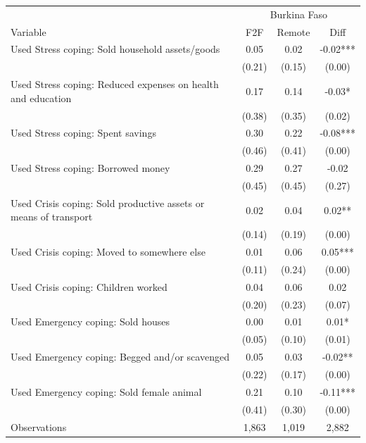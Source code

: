 \begin{tabular}{l*{3}c}
\hline\hline
 & \multicolumn{3}{c}{Burkina Faso}\\ 
Variable & F2F & Remote & Diff \\
\hline
Used Stress coping: Sold household assets/goods&0.05&0.02&-0.02***\\
&(0.21)&(0.15)&(0.00)\\
Used Stress coping: Reduced expenses on health and education&0.17&0.14&-0.03*\\
&(0.38)&(0.35)&(0.02)\\
Used Stress coping: Spent savings&0.30&0.22&-0.08***\\
&(0.46)&(0.41)&(0.00)\\
Used Stress coping: Borrowed money&0.29&0.27&-0.02\\
&(0.45)&(0.45)&(0.27)\\
Used Crisis coping: Sold productive assets or means of transport&0.02&0.04&0.02**\\
&(0.14)&(0.19)&(0.00)\\
Used Crisis coping: Moved to somewhere else&0.01&0.06&0.05***\\
&(0.11)&(0.24)&(0.00)\\
Used Crisis coping: Children worked&0.04&0.06&0.02\\
&(0.20)&(0.23)&(0.07)\\
Used Emergency coping: Sold houses&0.00&0.01&0.01*\\
&(0.05)&(0.10)&(0.01)\\
Used Emergency coping: Begged and/or scavenged&0.05&0.03&-0.02**\\
&(0.22)&(0.17)&(0.00)\\
Used Emergency coping: Sold female animal&0.21&0.10&-0.11***\\
&(0.41)&(0.30)&(0.00)\\
\hline
Observations & 1,863 & 1,019 & 2,882 \\
\hline\hline
\end{tabular}
